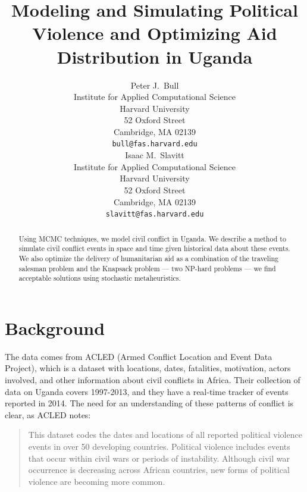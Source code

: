 \documentclass{article} %
\title{Modeling and Simulating Political Violence and Optimizing Aid Distribution in Uganda}
\author{
Peter J.~Bull \\
Institute for Applied Computational Science\\
Harvard University\\
52 Oxford Street \\
Cambridge, MA 02139 \\
\texttt{bull@fas.harvard.edu} \\
\And
Isaac M.~Slavitt \\
Institute for Applied Computational Science\\
Harvard University\\
52 Oxford Street \\
Cambridge, MA 02139 \\
\texttt{slavitt@fas.harvard.edu} \\
}
\begin{document}
\maketitle

\begin{abstract}
Using MCMC techniques, we model civil conflict in Uganda. We describe a method to simulate civil conflict events in space and time given historical data about these events. We also optimize the delivery of humanitarian aid as a combination of the traveling salesman problem and the Knapsack problem --- two NP-hard problems --- we find acceptable solutions using stochastic metaheuristics.
\end{abstract}

\section{Background}

The data comes from ACLED (Armed Conflict Location and Event Data Project), which is a dataset with locations, dates, fatalities, motivation, actors involved, and other information about civil conflicts in Africa. Their collection of data on Uganda covers 1997-2013, and they have a real-time tracker of events reported in 2014.\cite{ACLED} The need for an understanding of these patterns of conflict is clear, as ACLED notes:

\begin{quote}
This dataset codes the dates and locations of all reported political violence events in over 50 developing countries. Political violence includes events that occur within civil wars or periods of instability. Although civil war occurrence is decreasing across African countries, new forms of political violence are becoming more common.
\end{quote}

\begin{table}[H]
\caption{The ACLED Uganda Dataset}
\centering
{}
\end{table}
\end{document}
